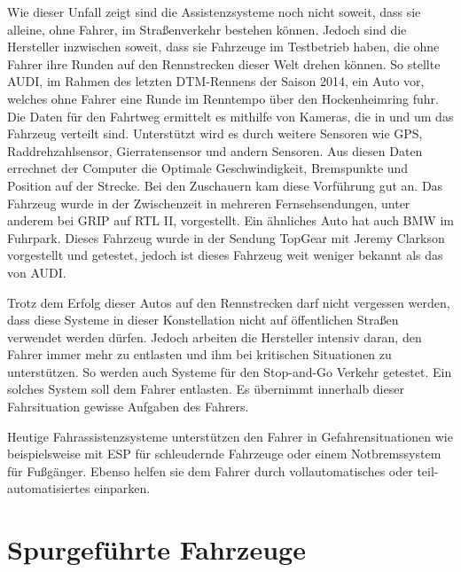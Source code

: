 Wie dieser Unfall zeigt sind die Assistenzsysteme noch nicht soweit, dass sie alleine, ohne Fahrer, im Straßenverkehr bestehen können. Jedoch sind die Hersteller inzwischen soweit, dass sie Fahrzeuge im Testbetrieb haben, die ohne Fahrer ihre Runden auf den Rennstrecken dieser Welt drehen können. So stellte AUDI, im Rahmen des letzten DTM-Rennens der Saison 2014, ein Auto vor, welches ohne Fahrer eine Runde im Renntempo über den Hockenheimring fuhr. Die Daten für den Fahrtweg ermittelt es mithilfe von Kameras, die in und um das Fahrzeug verteilt sind. Unterstützt wird es durch weitere Sensoren wie GPS, Raddrehzahlsensor, Gierratensensor und andern Sensoren. Aus diesen Daten errechnet der Computer die Optimale Geschwindigkeit, Bremspunkte und Position auf der Strecke. Bei den Zuschauern kam diese Vorführung gut an. Das Fahrzeug wurde in der Zwischenzeit in mehreren Fernsehsendungen, unter anderem bei GRIP auf RTL II, vorgestellt. 
Ein ähnliches Auto hat auch BMW im Fuhrpark. Dieses Fahrzeug wurde in der Sendung TopGear mit Jeremy Clarkson vorgestellt und getestet, jedoch ist dieses Fahrzeug weit weniger bekannt als das von AUDI.

Trotz dem Erfolg dieser Autos auf den Rennstrecken darf nicht vergessen werden, dass diese Systeme in dieser Konstellation nicht auf öffentlichen Straßen verwendet werden dürfen. Jedoch arbeiten die Hersteller intensiv daran, den Fahrer immer mehr zu entlasten und ihm bei kritischen Situationen zu unterstützen. So werden auch Systeme für den Stop-and-Go Verkehr getestet. Ein solches System soll dem Fahrer entlasten. Es übernimmt innerhalb dieser Fahrsituation gewisse Aufgaben des Fahrers.

Heutige Fahrassistenzsysteme unterstützen den Fahrer in Gefahrensituationen wie beispielsweise mit ESP für schleudernde Fahrzeuge oder einem Notbremssystem für Fußgänger. Ebenso helfen sie dem Fahrer durch vollautomatisches oder teil-automatisiertes einparken. 




\section{Spurgeführte Fahrzeuge}

